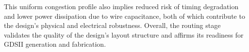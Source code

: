 This uniform congestion profile also implies reduced risk of timing degradation and lower power dissipation due to wire capacitance, both of which contribute to the design’s physical and electrical robustness. Overall, the routing stage validates the quality of the design's layout structure and affirms its readiness for GDSII generation and fabrication.

 

